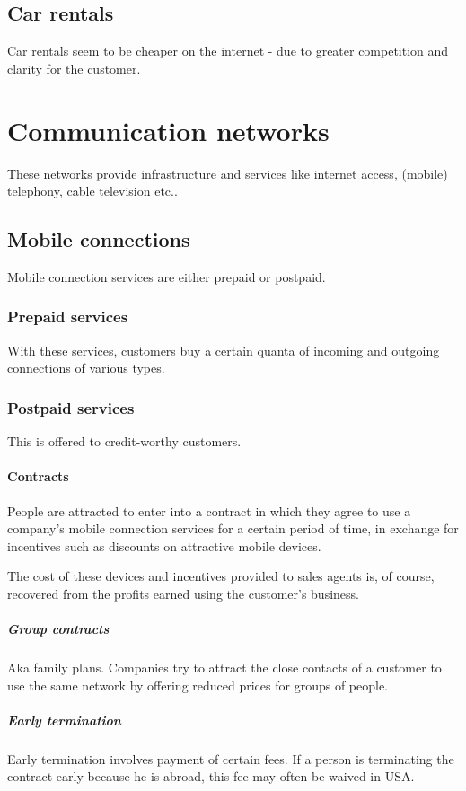 \documentclass[oneside, article]{memoir}
\begin{document}
\section{Car rentals}
Car rentals seem to be cheaper on the internet - due to greater competition and clarity for the customer.

\chapter{Communication networks}
These networks provide infrastructure and services like internet access, (mobile) telephony, cable television etc..

\section{Mobile connections}
Mobile connection services are either prepaid or postpaid.

\subsection{Prepaid services}
With these services, customers buy a certain quanta of incoming and outgoing connections of various types.

\subsection{Postpaid services}
This is offered to credit-worthy customers.

\subsubsection{Contracts}
People are attracted to enter into a contract in which they agree to use a company's mobile connection services for a certain period of time, in exchange for incentives such as discounts on attractive mobile devices.

The cost of these devices and incentives provided to sales agents is, of course, recovered from the profits earned using the customer's business.

\paragraph{Group contracts}
Aka family plans. Companies try to attract the close contacts of a customer to use the same network by offering reduced prices for groups of people.

\paragraph{Early termination}
Early termination involves payment of certain fees. If a person is terminating the contract early because he is abroad, this fee may often be waived in USA.
\end{document}
